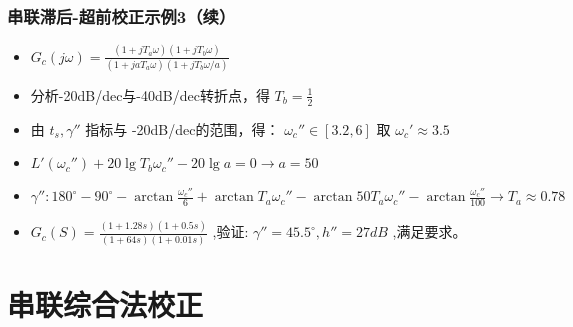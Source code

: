 \documentclass[table]{article}
\begin{document}
\begin{frame}
\frametitle{串联滞后-超前校正示例3（续）}
\label{sec-4-2-8}

\begin{itemize}
\item $G_c(j\omega)=\frac{(1+jT_a\omega)(1+jT_b\omega)}{(1+jaT_a\omega)(1+jT_b\omega/a)}$
\item 分析-20dB/dec与-40dB/dec转折点，得 $T_b=\frac{1}{2}$
\item 由 $t_s,\gamma''$ 指标与 -20dB/dec的范围，得： $\omega_c'' \in [3.2,6]$ 取 $\omega_c'\approx 3.5$
\item $L'(\omega_c'')+20\lg T_b\omega_c''-20\lg a=0\to a=50$
\item $\gamma'': 180^{\circ}-90^{\circ}-\arctan \frac{\omega_c''}{6}+\arctan T_a\omega_c''-\arctan 50T_a\omega_c''-\arctan\frac{\omega_c''}{100}\to T_a\approx 0.78$
\item $G_c(S)=\frac{(1+1.28s)(1+0.5s)}{(1+64s)(1+0.01s)}$ ,验证: $\gamma''=45.5^{\circ},h''=27dB$ ,满足要求。
\end{itemize}
\end{frame}
\section{串联综合法校正}
\label{sec-5}
\end{document}
